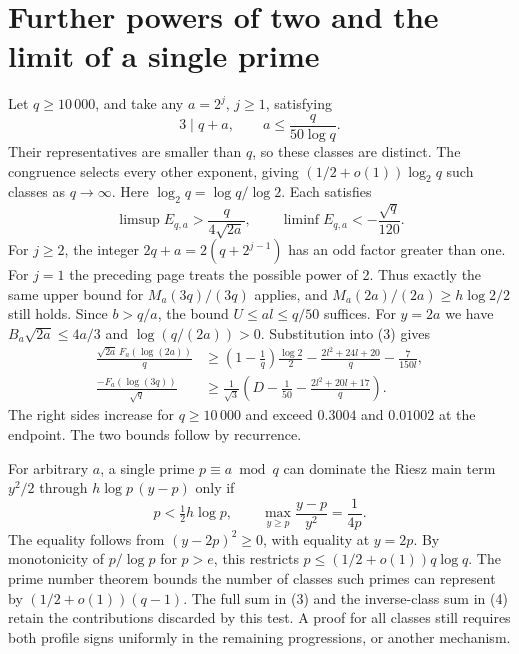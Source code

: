 \documentclass[11pt,a4paper]{article}
\newcommand{\head}[1]{\section*{\color{ink}#1}}
\begin{document}
\newpage
\head{Further powers of two and the limit of a single prime}
Let \(q\ge10\,000\), and take any \(a=2^j\), \(j\ge1\), satisfying
\[
                     3\mid q+a,\qquad a\le\frac{q}{50\log q}.
\]
Their representatives are smaller than \(q\), so these classes are distinct.
The congruence selects every other exponent, giving
\((1/2+o(1))\log_2 q\) such classes as \(q\to\infty\).
Here \(\log_2 q=\log q/\log2\). Each satisfies
\[
     \limsup E_{q,a}>\frac{q}{4\sqrt{2a}},
     \qquad \liminf E_{q,a}<-\frac{\sqrt q}{120}.
\]
For \(j\ge2\), the integer \(2q+a=2(q+2^{j-1})\) has an odd factor greater than one.
For \(j=1\) the preceding page treats the possible power of 2. Thus exactly the
same upper bound for \(M_a(3q)/(3q)\) applies, and
\(M_a(2a)/(2a)\ge h\log2/2\) still holds.
Since \(b>q/a\), the bound \(U\le al\le q/50\) suffices.
For \(y=2a\) we have \(B_a\sqrt{2a}\le4a/3\) and \(\log(q/(2a))>0\).
Substitution into (3) gives
\[
\begin{aligned}
 \frac{\sqrt{2a}\,F_a(\log(2a))}{q}
  &\ge\left(1-\frac1q\right)\frac{\log2}{2}
        -\frac{2l^2+24l+20}{q}-\frac7{150l},\\
 \frac{-F_a(\log(3q))}{\sqrt q}
  &\ge \frac1{\sqrt3}\left(D-\frac1{50}
                     -\frac{2l^2+20l+17}{q}\right).
\end{aligned}
\]
The right sides increase for \(q\ge10\,000\) and exceed \(0.3004\) and
\(0.01002\) at the endpoint. The two bounds follow by recurrence.

For arbitrary \(a\), a single prime \(p\equiv a\bmod q\) can dominate the Riesz
main term \(y^2/2\) through \(h\log p\,(y-p)\) only if
\[
  p<\tfrac12 h\log p,\qquad
  \max_{y\ge p}\frac{y-p}{y^2}=\frac1{4p}.
\]
The equality follows from \((y-2p)^2\ge0\), with equality at \(y=2p\). By
monotonicity of \(p/\log p\) for \(p>e\), this restricts
\(p\le(1/2+o(1))q\log q\). The prime number theorem bounds the number of classes
such primes can represent by \((1/2+o(1))(q-1)\).
The full sum in (3) and the inverse-class sum in (4) retain the contributions
discarded by this test. A proof for all classes still requires both profile
signs uniformly in the remaining progressions, or another mechanism.
\end{document}
